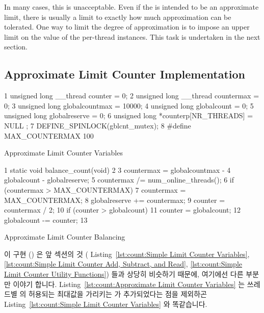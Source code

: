 In many cases, this is unacceptable.
Even if the  is intended to be an approximate limit,
there is usually a limit to exactly how much approximation can be tolerated.
One way to limit the degree of approximation is to impose an upper limit
on the value of the per-thread  instances.
This task is undertaken in the next section.
\fi

\subsection{Approximate Limit Counter Implementation}
\label{sec:count:Approximate Limit Counter Implementation}

\begin{listing}[tbp]
{ \scriptsize
\begin{verbbox}
  1 unsigned long __thread counter = 0;
  2 unsigned long __thread countermax = 0;
  3 unsigned long globalcountmax = 10000;
  4 unsigned long globalcount = 0;
  5 unsigned long globalreserve = 0;
  6 unsigned long *counterp[NR_THREADS] = { NULL };
  7 DEFINE_SPINLOCK(gblcnt_mutex);
  8 #define MAX_COUNTERMAX 100
\end{verbbox}
}
\centering
\theverbbox
\caption{Approximate Limit Counter Variables}
\label{lst:count:Approximate Limit Counter Variables}
\end{listing}

\begin{listing}[tbp]
{ \scriptsize
\begin{verbbox}
  1 static void balance_count(void)
  2 {
  3   countermax = globalcountmax -
  4                globalcount - globalreserve;
  5   countermax /= num_online_threads();
  6   if (countermax > MAX_COUNTERMAX)
  7     countermax = MAX_COUNTERMAX;
  8   globalreserve += countermax;
  9   counter = countermax / 2;
 10   if (counter > globalcount)
 11     counter = globalcount;
 12   globalcount -= counter;
 13 }
\end{verbbox}
}
\centering
\theverbbox
\caption{Approximate Limit Counter Balancing}
\label{lst:count:Approximate Limit Counter Balancing}
\end{listing}

이 구현 () 은 앞 섹션의 것 (
Listing~\ref{lst:count:Simple Limit Counter Variables},
\ref{lst:count:Simple Limit Counter Add, Subtract, and Read},
\ref{lst:count:Simple Limit Counter Utility Functions}) 들과 상당히 비슷하기
때문에, 여기에선 다른 부분만 이야기 합니다.
Listing~\ref{lst:count:Approximate Limit Counter Variables} 는 쓰레드별
 의 허용되는 최대값을 가리키는  가
추가되었다는 점을 제외하곤
Listing~\ref{lst:count:Simple Limit Counter Variables} 와 똑같습니다.

